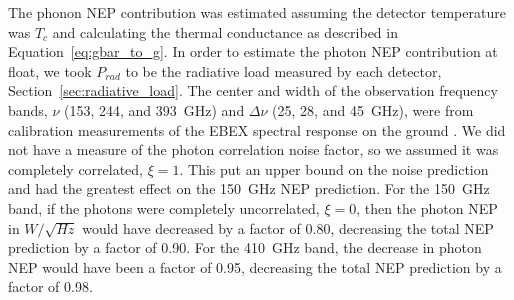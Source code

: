 The phonon \ac{NEP} contribution was estimated assuming the detector temperature was $T_{c}$ and calculating the thermal conductance as described in Equation~\ref{eq:gbar_to_g}. 
In order to estimate the photon \ac{NEP} contribution at float, we took $P_{rad}$ to be the radiative load measured by each detector, Section~\ref{sec:radiative_load}. 
The center and width of the observation frequency bands, $\nu$ (153, 244, and 393~GHz) and $\Delta \nu$ (25, 28, and 45~GHz), were from calibration measurements of the \ac{EBEX} spectral response on the ground \cite{Zilic2014}. 
We did not have a measure of the photon correlation noise factor, so we assumed it was completely correlated, $\xi=1$.
This put an upper bound on the noise prediction and had the greatest effect on the 150~GHz \ac{NEP} prediction. 
For the 150~GHz band, if the photons were completely uncorrelated, $\xi=0$, then the photon \ac{NEP} in $W/\sqrt{Hz}$ would have decreased by a factor of 0.80, decreasing the total \ac{NEP} prediction by a factor of 0.90. 
For the 410~GHz band, the decrease in photon \ac{NEP} would have been a factor of 0.95, decreasing the total \ac{NEP} prediction by a factor of 0.98. 


%


